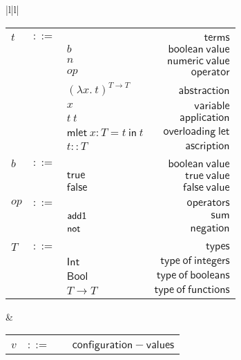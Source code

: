 \documentclass[preprint,authoryear,sort&compress,9pt,nocopyrightspace]{article}
\newcommand{\ascrip}[1]{#1::T}
\newcommand{\oletD}{\mathsf{mlet} \ x : T = t \ \mathsf{in}  \ t}
\newcommand{\app}[2]{#1 \ #2}
\newcommand{\absST}[2]{(\lambda #1. \ #2)^{T \to T}}
\newcommand{\negacion}[1]{\mathsf{not} \ #1}
\newcommand{\suma}[1]{\mathsf{add1} \ #1}
\newcommand{\truet}{\mathsf{true}}
\newcommand{\falset}{\mathsf{false}}
\newcommand{\boolt}{\mathsf{Bool}}
\newcommand{\intt}{\mathsf{Int}}
\begin{document}
\setlength{\topmargin}{-25mm}
\setlength{\textheight}{230mm}
\begin{figure}
\begin{small}
\begin{center}
\hspace*{-2cm}
\begin{tabular}{|l|l|}
\hline
\begin{tabular}{l c l r}
&&&\\
$t$&$::=$&&$\mathsf {terms}$\\
&&$b$&$\mathsf {boolean \ value}$\\
&&$n$&$\mathsf {numeric \ value}$\\
&&$op$&$\mathsf{operator}$\\
&&$\absST {x}{t}$&\ $\mathsf {abstraction}$\\
&&$x$&$\mathsf {variable}$\\
&&$\app {t}{t}$&$\mathsf {application}$\\
&&$\oletD$&$\mathsf {overloading \ let}$\\
&&$\ascrip {t}$&$\mathsf {ascription}$\\
&&&\\
$b$&$::=$&&$\mathsf {boolean \ value}$\\
&&$\truet$&$\mathsf {true \ value}$\\
&&$\falset$&$\mathsf {false \ value}$\\
&&&\\
$op$&$::=$&&$\mathsf {operators}$\\
&&$\suma$&$\mathsf {sum}$\\
&&$\negacion$&$\mathsf{negation} $\\
&&&\\
$T$&$::=$&&$\mathsf {types}$\\
&&$\intt$&$\mathsf {type \ of \ integers}$\\
&&$\boolt$&$\mathsf {type \ of \ booleans}$\\
&&$T \to T$&$\mathsf {type \ of \ functions}$\\
\end{tabular}
& \begin{tabular}{l c l r}
&&&\\
$v$&$::=$&&$\mathsf {configuration-values}$\\

\end{tabular}
\end{tabular}
\end{center}
\end{small}
\end{figure}
\end{document}
